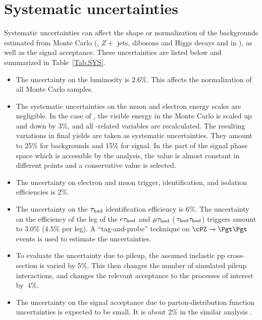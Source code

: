 \section{Systematic uncertainties}
\label{sect:sys}
Systematic uncertainties can affect the shape or normalization of the
backgrounds estimated from Monte Carlo (\ttbar, $Z+$ jets, dibosons and Higgs decays and \wjets in \tauTau \bintwo), 
as well as the signal acceptance.
These uncertainties are listed below and summarized in Table~\ref{Tab.SYS}.


\begin{itemize}

\item The uncertainty on the luminosity  is $2.6\%$.  This affects the
  normalization of all Monte Carlo samples.
 
\item  The systematic uncertainties on the muon and electron energy scales
  are negligible.  In the case of \Tau, the visible energy in the Monte Carlo
  is scaled up and down by $3\%$, and all \Tau-related variables are
  recalculated.  The resulting variations in final yields are taken as
  systematic
  uncertainties.  They amount to 25\% for backgrounds and 15\% for signal.
  In the part of the signal phase space which is accessible by the analysis,
  the value is almost constant in different points and a conservative value is selected.

\item The uncertainty on electron and muon trigger, identification, and
  isolation efficiencies is $2\%$.

\item The uncertainty on the $\tau_{\rm had}$ identification efficiency is $6\%$. 
  The uncertainty on the efficiency of the \Tau leg of the $e\tau_{\rm had}$ and
  $\mu\tau_{\rm had}$ ($\,\tau_{\rm had}\tau_{\rm had}$) triggers amount to $3.0\%$ ($4.5\%$ per leg).
  A ``tag-and-probe'' technique on $\cPZ\to \Pgt\Pgt$ events is used to estimate the 
  uncertainties.

\item To evaluate the uncertainty due to pileup, the assumed inelastic
  pp cross-section is varied by 5\%.  This then changes the number
  of simulated pileup interactions, and changes the relevant acceptance
  to the processes of interest by $~4 \%$.

\item The uncertainty on the signal acceptance due to parton-distribution
  function uncertainties is expected to be small.
  It is about $2\%$ in the similar analysis \cite{Khachatryan:2014qwa}.


\end{itemize}

